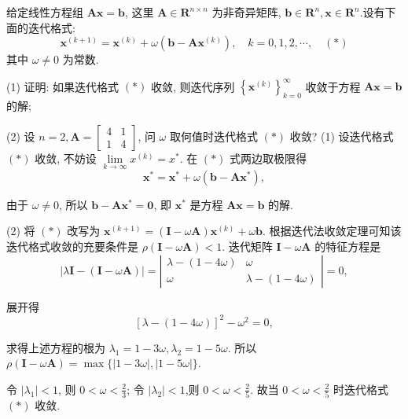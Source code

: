   \begin{tcolorbox}[enhanced,colback=10,colframe=9,breakable,coltitle=green!25!black,title=2024]
 给定线性方程组 $ \boldsymbol{A x}=\boldsymbol{b} $, 这里 $ \boldsymbol{A} \in \mathbf{R}^{n \times n} $ 为非奇异矩阵, $ \boldsymbol{b} \in \mathbf{R}^{n}, \boldsymbol{x} \in \mathbf{R}^{n} $.设有下面的迭代格式:
$$
\boldsymbol{x}^{(k+1)}=\boldsymbol{x}^{(k)}+\omega\left(\boldsymbol{b}-\boldsymbol{A} \boldsymbol{x}^{(k)}\right), \quad k=0,1,2, \cdots,\quad(*)
$$
其中 $ \omega \neq 0 $ 为常数.

(1) 证明: 如果迭代格式 $(*)$ 收敛, 则迭代序列 $ \left\{\boldsymbol{x}^{(k)}\right\}_{k=0}^{\infty} $ 收敛于方程 $ \boldsymbol{A x}=\boldsymbol{b} $的解;

(2) 设 $ n=2, \boldsymbol{A}=\left[\begin{array}{ll}4 & 1 \\ 1 & 4\end{array}\right] $, 问 $ \omega $ 取何值时迭代格式 $(*)$ 收敛?
 \tcblower
 (1) 设迭代格式 $(*)$ 收敛, 不妨设 $ \lim\limits _{k \rightarrow \infty} x^{(k)}=x^{*} $. 在 $(*)$ 式两边取极限得
$$
\boldsymbol{x}^{*}=\boldsymbol{x}^{*}+\omega\left(\boldsymbol{b}-\boldsymbol{A} \boldsymbol{x}^{*}\right),
$$

由于 $ \omega \neq 0 $, 所以 $ \boldsymbol{b}-\boldsymbol{A} \boldsymbol{x}^{*}=\mathbf{0} $, 即 $ \boldsymbol{x}^{*} $ 是方程 $ \boldsymbol{A x}=\boldsymbol{b} $ 的解.

(2) 将 $(*)$ 改写为 $ \boldsymbol{x}^{(k+1)}=(\boldsymbol{I}-\omega \boldsymbol{A}) \boldsymbol{x}^{(k)}+\omega \boldsymbol{b} $. 根据迭代法收敛定理可知该迭代格式收敛的充要条件是 $ \rho(\boldsymbol{I}-\omega \boldsymbol{A})<1 $. 迭代矩阵 $ \boldsymbol{I}-\omega \boldsymbol{A} $ 的特征方程是
$$
|\lambda \boldsymbol{I}-(\boldsymbol{I}-\omega \boldsymbol{A})|=\left|\begin{array}{cc}
\lambda-(1-4 \omega) & \omega \\
\omega & \lambda-(1-4 \omega)
\end{array}\right|=0,
$$

展开得
$$
[\lambda-(1-4 \omega)]^{2}-\omega^{2}=0,
$$

求得上述方程的根为 $ \lambda_{1}=1-3 \omega, \lambda_{2}=1-5 \omega $. 
所以 $\rho(\boldsymbol{I}-\omega \boldsymbol{A})=\max \{|1-3 \omega|,|1-5\omega|\} $.

令 $ \left|\lambda_{1}\right|<1 $, 则 $ 0<\omega<\frac{2}{3} $; 令 $ \left|\lambda_{2}\right|<1 $,则 $ 0<\omega<\frac{2}{5} $. 故当 $ 0<\omega<\frac{2}{5} $ 时迭代格式 $(*)$ 收敛.

 \end{tcolorbox}

